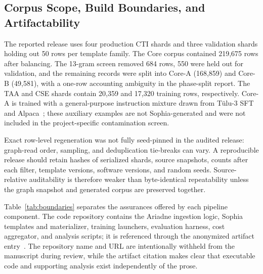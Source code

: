 \documentclass[conference]{IEEEtran}
\begin{document}
\subsection{Corpus Scope, Build Boundaries, and Artifactability}
The reported release uses four production CTI shards and three validation shards holding out 50 rows per template family. The Core corpus contained 219,675 rows after balancing. The 13-gram screen removed 684 rows, 550 were held out for validation, and the remaining records were split into Core-A (168,859) and Core-B (49,581), with a one-row accounting ambiguity in the phase-split report. The TAA and CSE shards contain 20,359 and 17,320 training rows, respectively. Core-A is trained with a general-purpose instruction mixture drawn from T\"ulu-3 SFT~\cite{lambert2024tulu} and Alpaca~\cite{taori2023alpaca}; these auxiliary examples are not Sophia-generated and were not included in the project-specific contamination screen.

Exact row-level regeneration was not fully seed-pinned in the audited release: graph-read order, sampling, and deduplication tie-breaks can vary. A reproducible release should retain hashes of serialized shards, source snapshots, counts after each filter, template versions, software versions, and random seeds. Source-relative auditability is therefore weaker than byte-identical repeatability unless the graph snapshot and generated corpus are preserved together.

Table~\ref{tab:boundaries} separates the assurances offered by each pipeline component. The code repository contains the Ariadne ingestion logic, Sophia templates and materializer, training launchers, evaluation harness, cost aggregator, and analysis scripts; it is referenced through the anonymized artifact entry~\cite{anonartifact}. The repository name and URL are intentionally withheld from the manuscript during review, while the artifact citation makes clear that executable code and supporting analysis exist independently of the prose.
\end{document}
